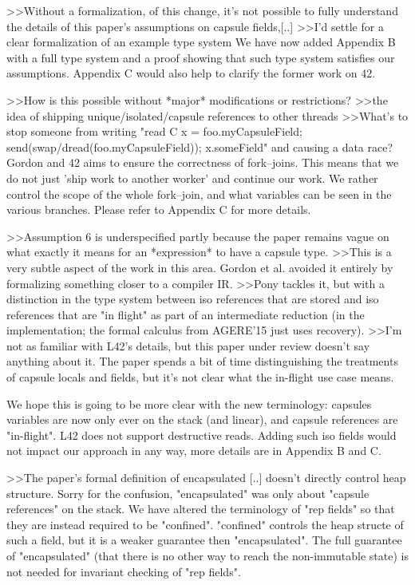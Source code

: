 >>Without a formalization, of this change, it's not possible to fully understand the details of this paper's assumptions on capsule fields,[..]
>>I'd settle for a clear formalization of an example type system
We have now added Appendix B with a full type system and a proof showing that such type system satisfies our assumptions.
Appendix C would also help to clarify the former work on 42.


>>How is this possible without *major* modifications or restrictions?
>>the idea of shipping unique/isolated/capsule references to other threads
>>What's to stop someone from writing "read C x = foo.myCapsuleField; send(swap/dread(foo.myCapsuleField)); x.someField" and causing a data race?
Gordon and 42 aims to ensure the correctness of fork--joins. This means that we do not just 'ship work to another worker' and continue our work.
We rather control the scope of the whole fork--join, and what variables can be seen in the various branches. Please refer to Appendix C for more details.


>>Assumption 6 is underspecified partly because the paper remains vague on what exactly it means for an *expression* to have a capsule type.
>>This is a very subtle aspect of the work in this area. Gordon et al. avoided it entirely by formalizing something closer to a compiler IR.
>>Pony tackles it, but with a distinction in the type system between iso references that are stored and iso references that are "in flight" as part of an intermediate reduction (in the implementation; the formal calculus from AGERE'15 just uses recovery).
>>I'm not as familiar with L42's details, but this paper under review doesn't say anything about it. The paper spends a bit of time distinguishing the treatments of capsule locals and fields, but it's not clear what the in-flight use case means.

We hope this is going to be more clear with the new terminology: capsules variables are now only ever on the stack (and linear), and capsule references are "in-flight".
L42 does not support destructive reads. Adding such iso fields would not impact our approach in any way, more details are in Appendix B and C.

>>The paper's formal definition of encapsulated [..]  doesn't directly control heap structure.
Sorry for the confusion, "encapsulated" was only about "capsule references" on the stack.
We have altered the terminology of "rep fields" so that they are instead required to be "confined".
"confined" controls the heap structe of such a field, but it is a weaker guarantee then "encapsulated".
The full guarantee of "encapsulated" (that there is no other way to reach the non-immutable state) is not needed for invariant checking of "rep fields".


